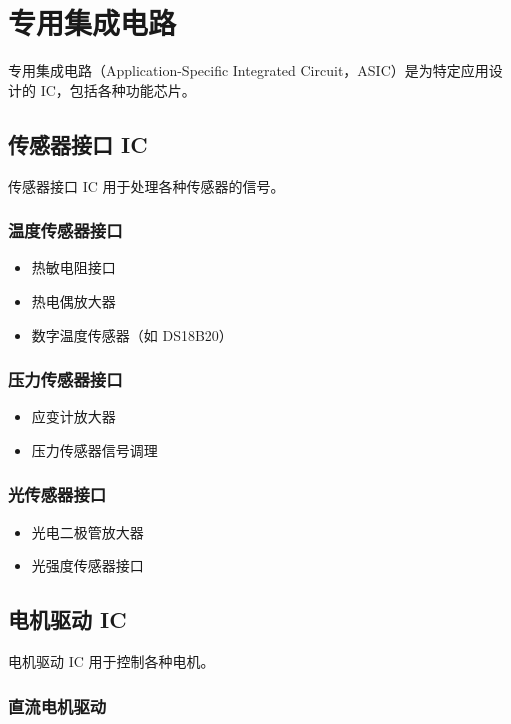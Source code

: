 \section{专用集成电路}

专用集成电路（Application-Specific Integrated Circuit，ASIC）是为特定应用设计的 IC，包括各种功能芯片。

\subsection{传感器接口 IC}

传感器接口 IC 用于处理各种传感器的信号。

\subsubsection{温度传感器接口}

\begin{itemize}
  \item 热敏电阻接口
  \item 热电偶放大器
  \item 数字温度传感器（如 DS18B20）
\end{itemize}

\subsubsection{压力传感器接口}

\begin{itemize}
  \item 应变计放大器
  \item 压力传感器信号调理
\end{itemize}

\subsubsection{光传感器接口}

\begin{itemize}
  \item 光电二极管放大器
  \item 光强度传感器接口
\end{itemize}

\subsection{电机驱动 IC}

电机驱动 IC 用于控制各种电机。

\subsubsection{直流电机驱动}

